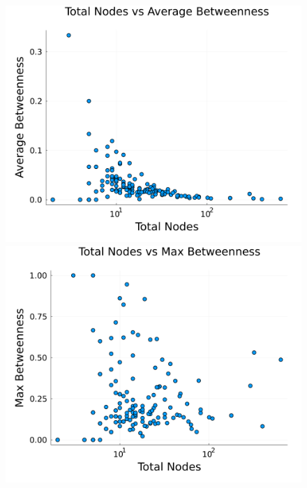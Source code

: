 \begin{figure}[H]
    \centering
    \begin{minipage}{0.5\textwidth}
        \centering
        \includegraphics[width=1\linewidth]{images/task44/TotalNodesVsAverageBetweenness.png}
    \end{minipage}%
    \begin{minipage}{0.5\textwidth}
        \centering
        \includegraphics[width=1\linewidth]{images/task44/TotalNodesVsMaxBetweenness.png}
    \end{minipage}
    \caption{}
    \label{fig:TotalNodesVsMaxBetweenness}
    \label{fig:TotalNodesVsAverageBetweenness}
\end{figure}


